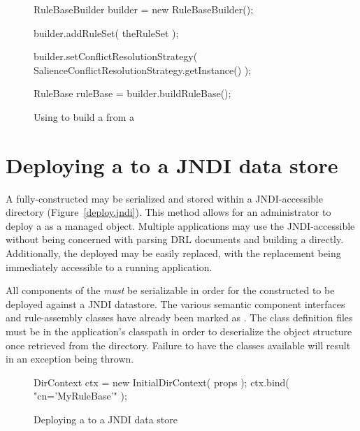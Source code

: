 \begin{figure}
\begin{javaCodelisting}
RuleBaseBuilder builder = new RuleBaseBuilder();

builder.addRuleSet( theRuleSet );

builder.setConflictResolutionStrategy( 
                            SalienceConflictResolutionStrategy.getInstance() );

RuleBase ruleBase = builder.buildRuleBase();
\end{javaCodelisting}
\caption{Using  to build a  from a }
\label{rulebasebuilder}
\end{figure}

\section{Deploying a  to a JNDI data store}

A fully-constructed  may be serialized and stored
within a JNDI-accessible  directory
(Figure~\vref{deploy.jndi}).  This method allows for an administrator
to deploy a  as a managed object.  Multiple
applications may use the JNDI-accessible  without
being concerned with parsing DRL documents and building a
 directly.  Additionally, the deployed
 may be easily replaced, with the replacement being
immediately accessible to a running application.

All components of the  \emph{must} be serializable 
in order for the constructed  to be deployed against
a JNDI datastore.  The various semantic component interfaces and
rule-assembly classes have already been marked as
.  The class definition files must be
in the application's classpath in order to deserialize the object
structure once retrieved from the directory.  Failure to have
the classes available will result in an exception being thrown.

\begin{figure}
\begin{javaCodelisting}
DirContext ctx = new InitialDirContext( props );
ctx.bind( "cn='MyRuleBase'" );
\end{javaCodelisting}
\caption{Deploying a  to a JNDI data store}
\label{deploy.jndi}
\end{figure}

